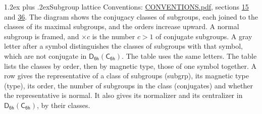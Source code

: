 \documentclass[10pt,a4paper]{article}
\makeatletter
\renewcommand\section{\@startsection{section}{1}{\z@}{-3ex plus -1ex minus -.2ex}%
  {1.2ex plus .2ex}{\normalfont\large\sffamily\bfseries\color{parttitle}}}
\numberwithin{equation}{section}
\newcommand{\grp}[1]{\mathsf{#1}}
\makeatother
\begin{document}
\section{Subgroup lattice}\label{s:subgroups}
Conventions: \href{../../CONVENTIONS.pdf}{CONVENTIONS.pdf}, sections \href{../../../rotation/CONVENTIONS.pdf\#conv.15}{15} and \href{../../CONVENTIONS.pdf\#conv.36}{36}.
The diagram shows the conjugacy classes of subgroups, each joined to the classes of its maximal subgroups, and the orders increase upward. \label{n:index.conjugates.c}\label{n:mark.conjugates}A normal subgroup is framed, and ${\times}c$ is the number $c > 1$ of conjugate subgroups. \label{n:mark.letter}A gray letter after a symbol distinguishes the classes of subgroups with that symbol, which are not conjugate in $\grp{D_{6h}}(\grp{C_{6h}})$. The table uses the same letters. The table lists the classes by order, then by magnetic type, those of one symbol together. \label{n:head.subgroup}\label{n:head.magnetic.type}\label{n:head.order}\label{n:head.conjugates}\label{n:head.normal}A row gives the representative of a class of subgroups (subgrp), its magnetic type (type), its order, the number of subgroups in the class (conjugates) and whether the representative is normal. \label{n:head.normalizer}\label{n:head.centralizer}It also gives its normalizer and its centralizer in $\grp{D_{6h}}(\grp{C_{6h}})$, by their classes. 
\end{document}

